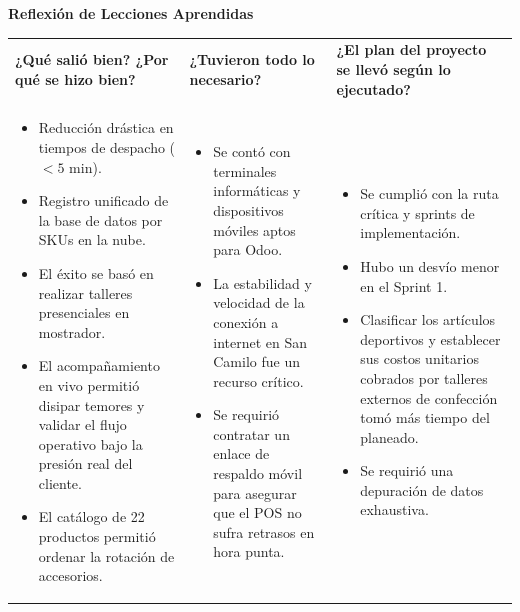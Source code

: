 \documentclass[11pt]{article}
\begin{document}
\newpage
\textbf{Reflexión de Lecciones Aprendidas}

\begin{longtable}{|p{5.1cm}|p{5.1cm}|p{5.1cm}|}
\hline
\rowcolor{RoundGray}\multicolumn{3}{|l|}{\textbf{Primera Ronda}} \\ \hline
\rowcolor{HeaderGray}\textbf{¿Qué salió bien? ¿Por qué se hizo bien?} & \textbf{¿Tuvieron todo lo necesario?} & \textbf{¿El plan del proyecto se llevó según lo ejecutado?} \\ \hline
\begin{itemize}[leftmargin=*,nosep]
    \item Reducción drástica en tiempos de despacho ($<5$ min).
    \item Registro unificado de la base de datos por SKUs en la nube.
    \item El éxito se basó en realizar talleres presenciales en mostrador.
    \item El acompañamiento en vivo permitió disipar temores y validar el flujo operativo bajo la presión real del cliente.
    \item El catálogo de 22 productos permitió ordenar la rotación de accesorios.
\end{itemize} &
\begin{itemize}[leftmargin=*,nosep]
    \item Se contó con terminales informáticas y dispositivos móviles aptos para Odoo.
    \item La estabilidad y velocidad de la conexión a internet en San Camilo fue un recurso crítico.
    \item Se requirió contratar un enlace de respaldo móvil para asegurar que el POS no sufra retrasos en hora punta.
\end{itemize} &
\begin{itemize}[leftmargin=*,nosep]
    \item Se cumplió con la ruta crítica y sprints de implementación.
    \item Hubo un desvío menor en el Sprint 1.
    \item Clasificar los artículos deportivos y establecer sus costos unitarios cobrados por talleres externos de confección tomó más tiempo del planeado.
    \item Se requirió una depuración de datos exhaustiva.
\end{itemize} \\ \hline
\end{longtable}
\end{document}
